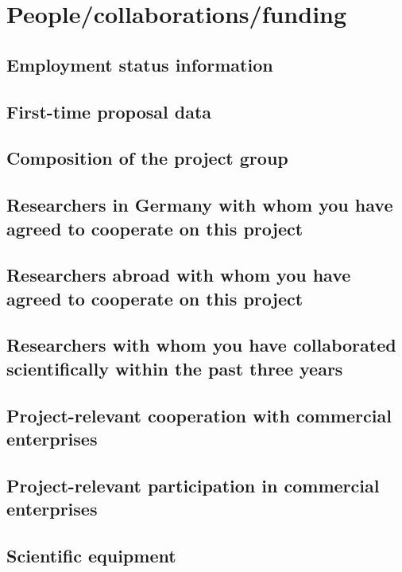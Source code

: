 \section{People/collaborations/funding}\label{sec:funds}

\subsection{Employment status information}

\subsection{First-time proposal data}

\subsection{Composition of the project group}

\subsection{Researchers in Germany with whom you have agreed to cooperate on this project}

\subsection{Researchers abroad with whom you have agreed to cooperate on this project}

\subsection{Researchers with whom you have collaborated scientifically within the past three years}

\subsection{Project-relevant cooperation with commercial enterprises}

\subsection{Project-relevant participation in commercial enterprises}

\subsection{Scientific equipment}

